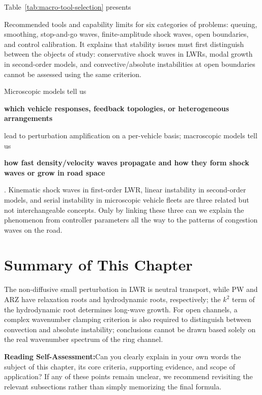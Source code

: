 \documentclass[11pt,a4paper,openany]{book}
\numberwithin{equation}{chapter}
\numberwithin{figure}{chapter}
\numberwithin{table}{chapter}
\newcommand{\tabletext}[2]{%
  \par\smallskip\noindent
  Table~\ref{#1} presents #2
\par\smallskip
}
\newcommand{\sectionwrapup}[1]{%
  \section{Summary of This Chapter}
  \begin{tcolorbox}[summarybox,title=\textbf{Chapter Review}]
  #1
  \par\smallskip
  \textbf{Reading Self-Assessment:}Can you clearly explain in your own words the subject of this chapter, its core criteria, supporting evidence, and scope of application? If any of these points remain unclear, we recommend revisiting the relevant subsections rather than simply memorizing the final formula.
\end{tcolorbox}
  \clearpage
}
\begin{document}
\tabletext{tab:macro-tool-selection}{




Recommended tools and capability limits for six categories of problems: queuing, smoothing, stop-and-go waves, finite-amplitude shock waves, open boundaries, and control calibration. It explains that stability issues must first distinguish between the objects of study: conservative shock waves in LWRs, modal growth in second-order models, and convective/absolute instabilities at open boundaries cannot be assessed using the same criterion.
}

\begin{tcolorbox}[keybox,title=\textbf{Relationship Between This Chapter and Previous Sections}]

Microscopic models tell us




\textbf{which vehicle responses, feedback topologies, or heterogeneous arrangements}




lead to perturbation amplification on a per-vehicle basis; macroscopic models tell us




\textbf{how fast density/velocity waves propagate and how they form shock waves or grow in road space}




. Kinematic shock waves in first-order LWR, linear instability in second-order models, and serial instability in microscopic vehicle fleets are three related but not interchangeable concepts. Only by linking these three can we explain the phenomenon from controller parameters all the way to the patterns of congestion waves on the road.


\end{tcolorbox}

\sectionwrapup{The non-diffusive small perturbation in LWR is neutral transport, while PW and ARZ have relaxation roots and hydrodynamic roots, respectively; the $k^2$ term of the hydrodynamic root determines long-wave growth. For open channels, a complex wavenumber clamping criterion is also required to distinguish between convection and absolute instability; conclusions cannot be drawn based solely on the real wavenumber spectrum of the ring channel.}
\end{document}
